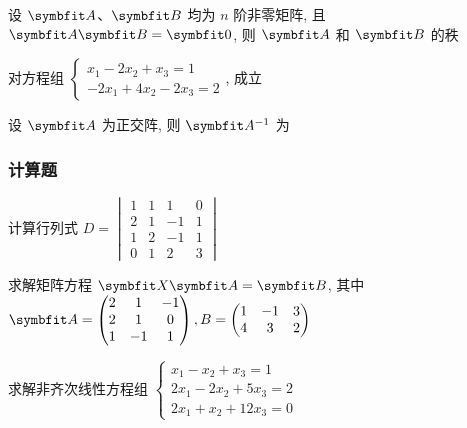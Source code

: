 \begin{ti}
	设 $\bA$、$\bB$ 均为 $n$ 阶非零矩阵, 且 $\bA \bB = \symbfit 0$, 则 $\bA$ 和 $\bB$ 的秩 \kuo
\end{ti}

\begin{ti}
	对方程组 $\begin{cases}
		x_{1} - 2x_{2} + x_{3} = 1 \\
		-2x_{1} + 4x_{2} - 2x_{3} = 2
	\end{cases}$, \kuo{} 成立
\end{ti}

\begin{ti}
	设 $\bA$ 为正交阵, 则 $\bA^{-1}$ 为 \kuo
\end{ti}

\subsubsection{计算题}
\begin{ti}[8 分]
	计算行列式 $D = \begin{vmatrix}
		1 & 1 & 1 & 0 \\
		2 & 1 & -1 & 1 \\
		1 & 2 & -1 & 1 \\
		0 & 1 & 2 & 3
	\end{vmatrix}$
\end{ti}

\begin{ti}[10 分]
	求解矩阵方程 $\bX \bA = \bB$, 其中 $\bA = \begin{pmatrix}
		2 & 1 & -1 \\
		2 & 1 & 0 \\
		1 & -1 & 1
	\end{pmatrix}, B = \begin{pmatrix}
		1 & -1 & 3 \\
		4 & 3 & 2
	\end{pmatrix}$
\end{ti}

\begin{ti}[10 分]
	求解非齐次线性方程组 $\begin{cases}
		x_{1} - x_{2} + x_{3} = 1 \\
		2x_{1} - 2x_{2} + 5x_{3} = 2 \\
		2x_{1} + x_{2} + 12x_{3} = 0
	\end{cases}$
\end{ti}

